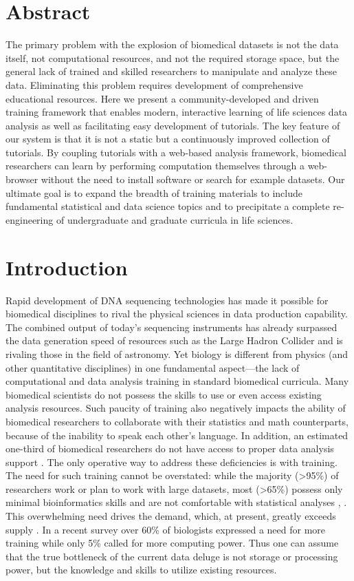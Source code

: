 \section*{Abstract}
The primary problem with the explosion of biomedical datasets is not the data itself, not computational resources, and not the required storage space, but the general lack of trained and skilled researchers to manipulate and analyze these data. Eliminating this problem requires development of comprehensive educational resources. Here we present a community-developed and driven training framework that enables modern, interactive learning of life sciences data analysis as well as facilitating easy development of tutorials. The key feature of our system is that it is not a static but a continuously improved collection of tutorials. By coupling tutorials with a web-based analysis framework, biomedical researchers can learn by performing computation themselves through a web-browser without the need to install software or search for example datasets. Our ultimate goal is to expand the breadth of training materials to include fundamental statistical and data science topics and to precipitate a complete re-engineering of undergraduate and graduate curricula in life sciences.

\section*{Introduction}
Rapid development of DNA sequencing technologies has made it possible for biomedical disciplines to rival the physical sciences in data production capability. The combined output of today’s sequencing instruments has already surpassed the data generation speed of resources such as the Large Hadron Collider and is rivaling those in the field of astronomy. Yet biology is different from physics (and other quantitative disciplines) in one fundamental aspect—the lack of computational and data analysis training in standard biomedical curricula. Many biomedical scientists do not possess the skills to use or even access existing analysis resources.
Such paucity of training also negatively impacts the ability of biomedical researchers to collaborate with their statistics and math counterparts, because of the inability to speak each other’s language. In addition, an estimated one-third of biomedical researchers do not have access to proper data analysis support \cite{larcombe2017elixir}. The only operative way to address these deficiencies is with training. The need for such training cannot be overstated: while the majority (>95\%) of researchers work or plan to work with large datasets, most (>65\%) possess only minimal bioinformatics skills and are not comfortable with statistical analyses \cite{larcombe2017elixir}, \cite{williams2017vision}.
This overwhelming need drives the demand, which, at present, greatly exceeds supply \cite{attwood2017global}. In a recent survey \cite{survey2013embl} over 60\% of biologists expressed a need for more training while only 5\% called for more computing power. Thus one can assume that the true bottleneck of the current data deluge is not storage or processing power, but the knowledge and skills to utilize existing resources.

